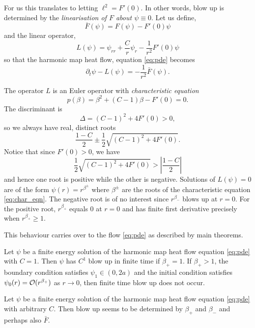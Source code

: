 \documentclass{amsart}
\begin{document}
For us this translates to letting \(\ell^2 = F'(0)\). In other words, blow up is determined by the \emph{linearisation of \(F\) about \(\psi \equiv 0\)}. Let us define,
\[
\bar{F} (\psi) = F(\psi) - F'(0) \psi
\]
and the linear operator,
\begin{equation}
\label{eq:L}
L(\psi) = \psi_{rr} + \frac{C}{r} \psi_r - \frac{1}{r^2} F'(0) \psi
\end{equation}
so that the harmonic map heat flow, equation \eqref{eq:pde} becomes
\begin{equation}
\partial_t \psi - L(\psi) = - \frac{1}{r^2} \bar{F}(\psi).
\end{equation}

The operator \(L\) is an Euler operator with \emph{characteristic equation}
\begin{equation}
\label{eq:char_eqn}
p(\beta) = \beta^2 + (C-1) \beta - F'(0) = 0.
\end{equation}
The discriminant is
\[
\Delta = (C-1)^2 + 4 F'(0) > 0,
\]
so we always have real, distinct roots
\[
\frac{1 - C}{2} \pm \frac{1}{2} \sqrt{(C-1)^2 + 4 F'(0)}.
\]
Notice that since \(F'(0) > 0\), we have
\[
\frac{1}{2} \sqrt{(C-1)^2 + 4 F'(0)} > \left|\frac{1-C}{2}\right|
\]
and hence one root is positive while the other is negative. Solutions of \(L(\psi) = 0\) are of the form \(\psi(r) = r^{\beta^{\pm}}\) where \(\beta^{\pm}\) are the roots of the characteristic equation \eqref{eq:char_eqn}. The negative root is of no interest since \(r^{\beta_-}\) blows up at \(r = 0\). For the positive root, \(r^{\beta_+}\) equals \(0\) at \(r = 0\) and has finite first derivative precisely when \(r^{\beta_+} \geq 1\).

This behaviour carries over to the flow \eqref{eq:pde} as described by main theorems.

\begin{mainthm}[Finite time blow up for \(C = 1\)]
\label{thm:mainC1}
Let \(\psi\) be a finite energy solution of the harmonic map heat flow equation \eqref{eq:pde} with \(C = 1\). Then \(\psi\) has \(C^1\) blow up in finite time if \(\beta_+ = 1\). If \(\beta_+ > 1\), the boundary condition satisfies \(\psi_1 \in (0, 2a)\) and the initial condition satisfies \(\psi_0(r) = \operatorname{\mathcal{O}}(r^{\beta_+})\) as \(r\to 0\), then finite time blow up does not occur.
\end{mainthm}

\begin{mainthm}
\label{thm:mainC}
Let \(\psi\) be a finite energy solution of the harmonic map heat flow equation \eqref{eq:pde} with arbitrary \(C\). {\color{red}Then blow up seems to be determined by \(\beta_+\) and \(\beta_-\) and perhaps also \(\bar{F}\)}.
\end{mainthm}
\end{document}
